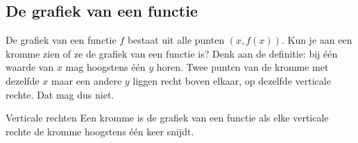 \begin{oefeningen}
\end{oefeningen}

\subsection{De grafiek van een functie}

De grafiek van een functie $f$ bestaat uit alle punten $(x, f(x))$. Kun je aan een kromme zien of ze de grafiek van een functie is? Denk aan de definitie: bij één waarde van $x$ mag hoogstens één $y$ horen. Twee punten van de kromme met dezelfde $x$ maar een andere $y$ liggen recht boven elkaar, op dezelfde verticale rechte. Dat mag dus niet.

\begin{theorie}
\begin{stelling}{Verticale rechten}
Een kromme is de grafiek van een functie als elke verticale rechte de kromme hoogstens één keer snijdt.
\end{stelling}
\end{theorie}

